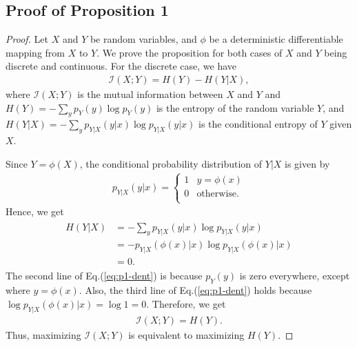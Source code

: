 \documentclass{article}
\begin{document}
\subsection{Proof of Proposition 1}
\begin{proof}
	Let $X$ and $Y$ be random variables, and $\phi$ be a deterministic differentiable mapping from $X$ to $Y$. We prove the proposition for both cases of $X$ and $Y$ being discrete and continuous. For the discrete case, we have
	\begin{gather}
		\mathcal{I}(X;Y) = H(Y) - H(Y|X),
	\end{gather}
	where $\mathcal{I}(X;Y)$ is the mutual information between $X$ and $Y$ and $H(Y) = -\sum_y p_Y(y)\log p_Y(y)$ is the entropy of the random variable $Y$, and $H(Y|X) = -\sum_y p_{Y|X}(y|x)\log p_{Y|X}(y|x)$ is the conditional entropy of $Y$ given $X$.
	
	Since $Y = \phi(X)$, the conditional probability distribution of $Y|X$ is given by
	\begin{gather}
		p_{Y|X}(y|x) = \left\{\begin{array}{lr}
			1 & y = \phi(x)\\
			0 & \text{otherwise}.\\
		\end{array}
		\right.
	\end{gather}
	Hence, we get
	\begin{gather}\label{eq:p1-dent}
		\begin{split}
			H(Y|X) &= -\sum_y p_{Y|X}(y|x)\log p_{Y|X}(y|x)\\
			&= -p_{Y|X}(\phi(x)|x)\log p_{Y|X}(\phi(x)|x) \\
			&= 0.
		\end{split}
	\end{gather}
	The second line of Eq.(\ref{eq:p1-dent}) is because $p_Y(y)$ is zero everywhere, except where $y = \phi(x)$. Also, the third line of Eq.(\ref{eq:p1-dent}) holds because $\log p_{Y|X}(\phi(x)|x) = \log 1 = 0$. Therefore, we get
	\begin{gather}
		\mathcal{I}(X;Y) = H(Y).
	\end{gather}
	Thus, maximizing $\mathcal{I}(X;Y)$ is equivalent to maximizing $H(Y)$.
	

\end{proof}
\end{document}
